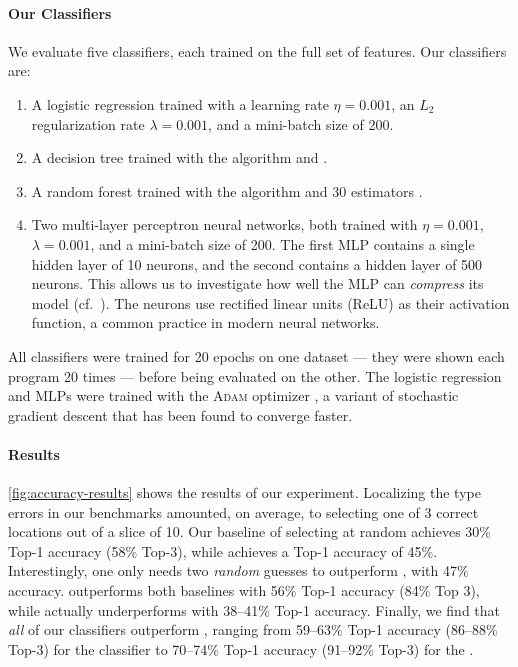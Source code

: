 \paragraph{Our Classifiers}
We evaluate five classifiers, each trained on the full set of features.
%
%
Our classifiers are:
%
\begin{enumerate}
\item A logistic regression trained with a learning rate
  $\eta = 0.001$, an $L_2$ regularization rate $\lambda = 0.001$, and a
  mini-batch size of 200.
\item A decision tree trained with the  algorithm and .
\item A random forest trained with the  algorithm and 30 estimators .
\item Two multi-layer perceptron neural networks, both trained with $\eta = 0.001$,
  $\lambda = 0.001$, and a mini-batch size of 200. The first MLP
  contains a single hidden layer of 10 neurons, and the second contains
  a hidden layer of 500 neurons. This allows us to investigate how well
  the MLP can \emph{compress} its model (cf.~\cite{FIXME}). The neurons
  use rectified linear units (ReLU) as their activation function, a
  common practice in modern neural networks.
\end{enumerate}
%
All classifiers were trained for 20 epochs on one dataset
--- \ie they were shown each program 20 times ---
before being evaluated on the other.
%
The logistic regression and MLPs were trained with the \textsc{Adam}
optimizer , a variant of stochastic gradient descent that has
been found to converge faster.



\paragraph{Results}
\autoref{fig:accuracy-results} shows the results of our experiment.
%
Localizing the type errors in our benchmarks amounted, on average, to
selecting one of 3 correct locations out of a slice of 10.
%
Our baseline of selecting at random achieves 30\% Top-1
accuracy (58\% Top-3), while \ocaml achieves a Top-1 accuracy of 45\%.
%
Interestingly, one only needs two \emph{random} guesses to outperform
\ocaml, with 47\% accuracy.
%
\sherrloc outperforms both baselines with 56\% Top-1 accuracy (84\% Top
3), while \mycroft actually underperforms \ocaml with 38--41\% Top-1
accuracy.
%
Finally, we find that \emph{all} of our classifiers outperform \sherrloc,
ranging from 59--63\% Top-1 accuracy (86--88\% Top-3) for the \linear
classifier to 70--74\% Top-1 accuracy (91--92\% Top-3) for the \hiddenFH.

